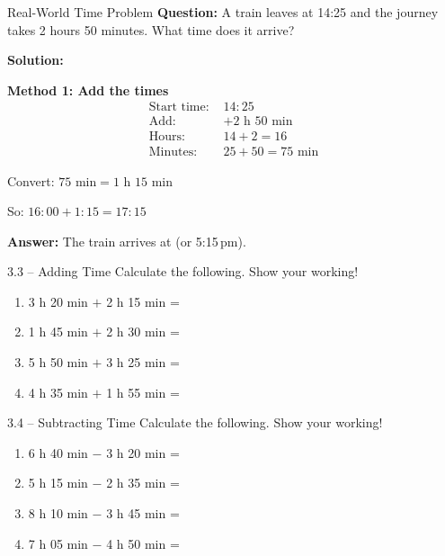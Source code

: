 \documentclass[12pt,a4paper]{article}
\begin{document}
\begin{examplebox}{Real-World Time Problem}
\textbf{Question:} A train leaves at 14:25 and the journey takes 2 hours 50 minutes. What time does it arrive?

\textbf{Solution:}

\textbf{Method 1: Add the times}
\begin{align*}
\text{Start time: } &14:25 \\
\text{Add: } &+ 2\text{ h }50\text{ min} \\
\hline
\text{Hours: } &14 + 2 = 16 \\
\text{Minutes: } &25 + 50 = 75\text{ min}
\end{align*}

Convert: $75\text{ min} = 1\text{ h }15\text{ min}$

So: $16:00 + 1:15 = 17:15$

\textbf{Answer:} The train arrives at  (or 5:15\,pm).
\end{examplebox}

\begin{exercisebox}{3.3 -- Adding Time}
Calculate the following. Show your working!

\begin{enumerate}[leftmargin=*]
\item 3 h 20 min $+$ 2 h 15 min = \underline{\hspace{4cm}}
\item 1 h 45 min $+$ 2 h 30 min = \underline{\hspace{4cm}}
\item 5 h 50 min $+$ 3 h 25 min = \underline{\hspace{4cm}}
\item 4 h 35 min $+$ 1 h 55 min = \underline{\hspace{4cm}}
\end{enumerate}
\end{exercisebox}

\begin{exercisebox}{3.4 -- Subtracting Time}
Calculate the following. Show your working!

\begin{enumerate}[leftmargin=*]
\item 6 h 40 min $-$ 3 h 20 min = \underline{\hspace{4cm}}
\item 5 h 15 min $-$ 2 h 35 min = \underline{\hspace{4cm}}
\item 8 h 10 min $-$ 3 h 45 min = \underline{\hspace{4cm}}
\item 7 h 05 min $-$ 4 h 50 min = \underline{\hspace{4cm}}
\end{enumerate}
\end{exercisebox}
\end{document}
